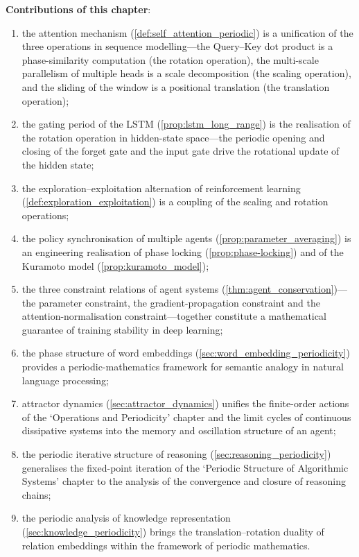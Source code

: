 \begin{remark}
\textbf{Contributions of this chapter}:
\begin{enumerate}[label=(\roman*)]
    \item the attention mechanism (\cref{def:self_attention_periodic}) is a unification of the three operations in sequence modelling---the Query--Key dot product is a phase-similarity computation (the rotation operation), the multi-scale parallelism of multiple heads is a scale decomposition (the scaling operation), and the sliding of the window is a positional translation (the translation operation);
    \item the gating period of the LSTM (\cref{prop:lstm_long_range}) is the realisation of the rotation operation in hidden-state space---the periodic opening and closing of the forget gate and the input gate drive the rotational update of the hidden state;
    \item the exploration--exploitation alternation of reinforcement learning (\cref{def:exploration_exploitation}) is a coupling of the scaling and rotation operations;
    \item the policy synchronisation of multiple agents (\cref{prop:parameter_averaging}) is an engineering realisation of phase locking (\cref{prop:phase-locking}) and of the Kuramoto model (\cref{prop:kuramoto_model});
    \item the three constraint relations of agent systems (\cref{thm:agent_conservation})---the parameter constraint, the gradient-propagation constraint and the attention-normalisation constraint---together constitute a mathematical guarantee of training stability in deep learning;
    \item the phase structure of word embeddings (\cref{sec:word_embedding_periodicity}) provides a periodic-mathematics framework for semantic analogy in natural language processing;
    \item attractor dynamics (\cref{sec:attractor_dynamics}) unifies the finite-order actions of the `Operations and Periodicity' chapter and the limit cycles of continuous dissipative systems into the memory and oscillation structure of an agent;
    \item the periodic iterative structure of reasoning (\cref{sec:reasoning_periodicity}) generalises the fixed-point iteration of the `Periodic Structure of Algorithmic Systems' chapter to the analysis of the convergence and closure of reasoning chains;
    \item the periodic analysis of knowledge representation (\cref{sec:knowledge_periodicity}) brings the translation--rotation duality of relation embeddings within the framework of periodic mathematics.
\end{enumerate}


\end{remark}
